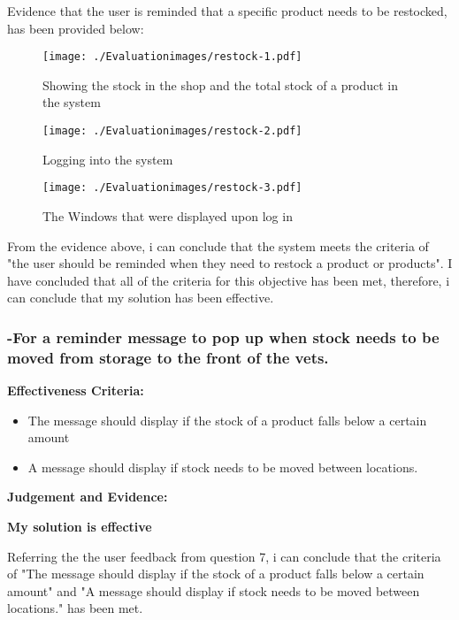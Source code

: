 Evidence that the user is reminded that a specific product needs to be restocked, has been provided below:

\begin{figure}[H]
\caption{Showing the stock in the shop and the total stock of a product in the system}
\hfill\texttt{[image: ./Evaluationimages/restock-1.pdf]}
\end{figure}

\begin{figure}[H]
\caption{Logging into the system}
\hfill\texttt{[image: ./Evaluationimages/restock-2.pdf]}
\end{figure}

\begin{figure}[H]
\caption{The Windows that were displayed upon log in}
\hfill\texttt{[image: ./Evaluationimages/restock-3.pdf]}
\end{figure}

From the evidence above, i can conclude that the system meets the criteria of "the user should be reminded when they need to restock a product or products". I have concluded that all of the criteria for this objective has been met, therefore, i can conclude that my solution has been effective.








\pagebreak
\subsubsection{-For a reminder message to pop up when stock needs to be moved from storage to the front of the vets. }

\textbf{Effectiveness Criteria:}\newline
\begin{itemize}
	\item{The message should display if the stock of a product falls below a certain amount}
	\item{A message should display if stock needs to be moved between locations.}
\end{itemize}

\textbf{Judgement and Evidence:} \newline

\textbf{\large{My solution is effective}}

Referring the the user feedback from question 7, i can conclude that the criteria of "The message should display if the stock of a product falls below a certain amount" and "A message should display if stock needs to be moved between locations." has been met.

